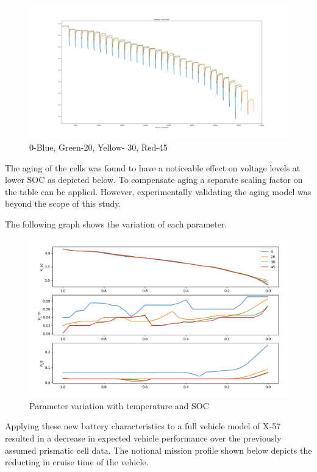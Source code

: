 \documentclass[]{aiaa-tc}%
\begin{document}
\begin{figure}[!htb]
	\centering
	\includegraphics[width=1.0\textwidth]{figures/All_Temp.png}
	\caption{0-Blue, Green-20, Yellow- 30, Red-45}
	\label{fig:AllTemp}
\end{figure}



The aging of the cells was found to have a noticeable effect on voltage levels at lower SOC as depicted below. To compensate aging a separate scaling factor on the table can be applied. However, experimentally validating the aging model was beyond the scope of this study.

The following graph shows the variation of each parameter.
\begin{figure}[!htb]
	\centering
	\includegraphics[width=1.0\textwidth]{figures/maps.png}
	\caption{Parameter variation with temperature and SOC}
	\label{fig:Map}
\end{figure}

Applying these new battery characteristics to a full vehicle model of X-57 resulted in a decrease in expected vehicle performance over the previously assumed prismatic cell data. The notional mission profile shown below depicts the reducting in cruise time of the vehicle.
\end{document}
